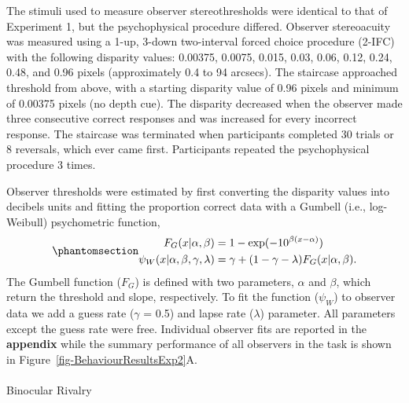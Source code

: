 \documentclass[
  12pt,
]{article}
\makeatletter
\let\oldparagraph\paragraph
\renewcommand{\paragraph}{
    \@ifstar
      \xxxParagraphStar
      \xxxParagraphNoStar
  }
\newcommand{\xxxParagraphStar}[1]{\oldparagraph*{#1}\mbox{}}
\newcommand{\xxxParagraphNoStar}[1]{\oldparagraph{#1}\mbox{}}
\makeatother
\begin{document}
The stimuli used to measure observer stereothresholds were identical to
that of Experiment 1, but the psychophysical procedure differed.
Observer stereoacuity was measured using a 1-up, 3-down two-interval
forced choice procedure (2-IFC) with the following disparity values:
0.00375, 0.0075, 0.015, 0.03, 0.06, 0.12, 0.24, 0.48, and 0.96 pixels
(approximately 0.4 to 94 arcsecs). The staircase approached threshold
from above, with a starting disparity value of 0.96 pixels and minimum
of 0.00375 pixels (no depth cue). The disparity decreased when the
observer made three consecutive correct responses and was increased for
every incorrect response. The staircase was terminated when participants
completed 30 trials or 8 reversals, which ever came first. Participants
repeated the psychophysical procedure 3 times.

Observer thresholds were estimated by first converting the disparity
values into decibels units and fitting the proportion correct data with
a Gumbell (i.e., log-Weibull) psychometric function,
\begin{equation}\protect\phantomsection\label{eq-GumbellFunction}{
\begin{aligned}
F_G(x|\alpha,\beta) &= 1 - \exp(-10^{\beta(x-\alpha)}) \\
\psi_W(x|\alpha,\beta,\gamma,\lambda) &= \gamma + (1 - \gamma - \lambda)F_G(x|\alpha,\beta).
\end{aligned}
}\end{equation} The Gumbell function (\(F_G\)) is defined with two
parameters, \(\alpha\) and \(\beta\), which return the threshold and
slope, respectively. To fit the function (\(\psi_W\)) to observer data
we add a guess rate (\(\gamma\) = 0.5) and lapse rate (\(\lambda\))
parameter. All parameters except the guess rate were free. Individual
observer fits are reported in the \textbf{appendix} while the summary
performance of all observers in the task is shown in
Figure~\ref{fig-BehaviourResultsExp2}A.

\paragraph{Binocular Rivalry}\label{binocular-rivalry}
\end{document}
